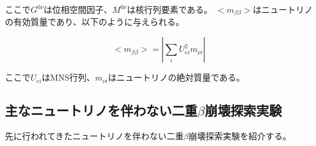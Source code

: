 \documentclass[a4paper,10pt]{jreport}
\begin{document}
ここで$G^{0\nu}$は位相空間因子、$M^{0\nu}$は核行列要素である。
$<m_{\beta\beta}>$はニュートリノの有効質量であり、以下のように与えられる。

\begin{equation} \label{Eq-EffectiveMass}
	< m_{\beta\beta} > =|\sum_i U_{ei}^2m_{\nu i}|
\end{equation}

ここで$U_{ei}$はMNS行列、$m_{\nu i}$はニュートリノの絶対質量である。




\subsection{主なニュートリノを伴わない二重$\beta$崩壊探索実験}

先に行われてきたニュートリノを伴わない二重$\beta$崩壊探索実験を紹介する。
\end{document}
